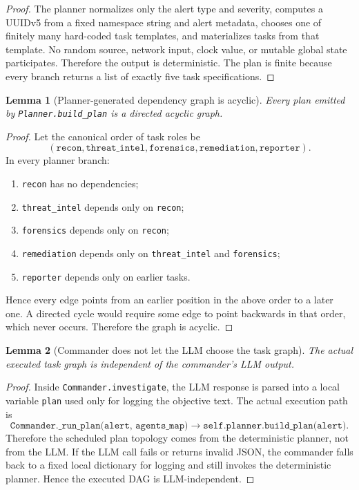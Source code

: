 \documentclass[11pt]{article}
\newtheorem{lemma}{Lemma}
\theoremstyle{definition}
\begin{document}
\begin{proof}
The planner normalizes only the alert type and severity, computes a UUIDv5 from a fixed
namespace string and alert metadata, chooses one of finitely many hard-coded task templates,
and materializes tasks from that template. No random source, network input, clock value, or
mutable global state participates. Therefore the output is deterministic. The plan is finite
because every branch returns a list of exactly five task specifications.
\end{proof}

\begin{lemma}[Planner-generated dependency graph is acyclic]
Every plan emitted by \texttt{Planner.build\_plan} is a directed acyclic graph.
\end{lemma}

\begin{proof}
Let the canonical order of task roles be
\[
(\texttt{recon}, \texttt{threat\_intel}, \texttt{forensics}, \texttt{remediation}, \texttt{reporter}).
\]
In every planner branch:
\begin{enumerate}[label=(\alph*)]
\item \texttt{recon} has no dependencies;
\item \texttt{threat\_intel} depends only on \texttt{recon};
\item \texttt{forensics} depends only on \texttt{recon};
\item \texttt{remediation} depends only on \texttt{threat\_intel} and \texttt{forensics};
\item \texttt{reporter} depends only on earlier tasks.
\end{enumerate}
Hence every edge points from an earlier position in the above order to a later one. A directed
cycle would require some edge to point backwards in that order, which never occurs. Therefore
the graph is acyclic.
\end{proof}

\begin{lemma}[Commander does not let the LLM choose the task graph]
The actual executed task graph is independent of the commander's LLM output.
\end{lemma}

\begin{proof}
Inside \texttt{Commander.investigate}, the LLM response is parsed into a local variable
\texttt{plan} used only for logging the objective text. The actual execution path is
\[
\texttt{Commander.\_run\_plan(alert, agents\_map)} \rightarrow
\texttt{self.planner.build\_plan(alert)}.
\]
Therefore the scheduled plan topology comes from the deterministic planner, not from the LLM.
If the LLM call fails or returns invalid JSON, the commander falls back to a fixed local
dictionary for logging and still invokes the deterministic planner. Hence the executed DAG is
LLM-independent.
\end{proof}
\end{document}
